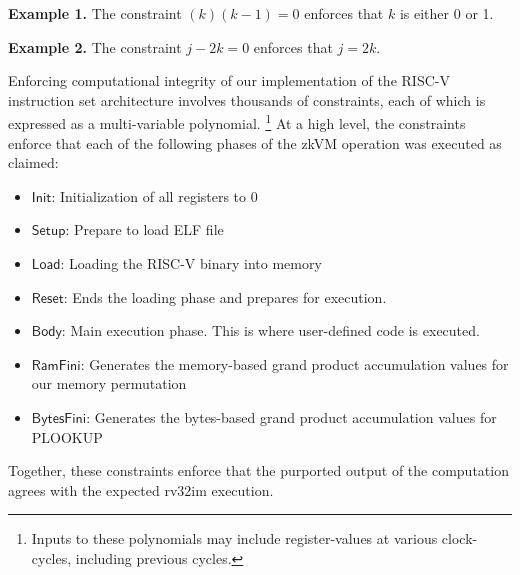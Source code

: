 \documentclass[10pt,letterpaper,titlepage]{article}
\theoremstyle{definition}
\begin{document}
\textbf{Example 1.} The constraint $(k)(k-1)=0$ enforces that $k$ is either 0 or 1. 

\textbf{Example 2.} The constraint $j-2k=0$ enforces that $j=2k$.

\noindent
Enforcing computational integrity of our implementation of the RISC-V instruction set architecture involves thousands of constraints, each of which is expressed as a multi-variable polynomial.%
\footnote{Inputs to these polynomials may include register-values at various clock-cycles, including previous cycles.}
At a high level, the constraints enforce that each of the following phases of the zkVM operation was executed as claimed: 
\begin{itemize}
  \item $\mathsf{Init}$: Initialization of all registers to 0
  \item $\mathsf{Setup}$: Prepare to load ELF file
  \item $\mathsf{Load}$: Loading the RISC-V binary into memory
  \item $\mathsf{Reset}$: Ends the loading phase and prepares for execution. 
  \item $\mathsf{Body}$: Main execution phase. This is where user-defined code is executed.
  \item $\mathsf{RamFini}$: Generates the memory-based grand product accumulation values for our memory permutation\cite{plonk}
  \item $\mathsf{BytesFini}$: Generates the bytes-based grand product accumulation values for PLOOKUP\cite{plookup}
\end{itemize}
Together, these constraints enforce that the purported output of the computation agrees with the expected rv32im \cite{rv32im} execution. 
\end{document}
